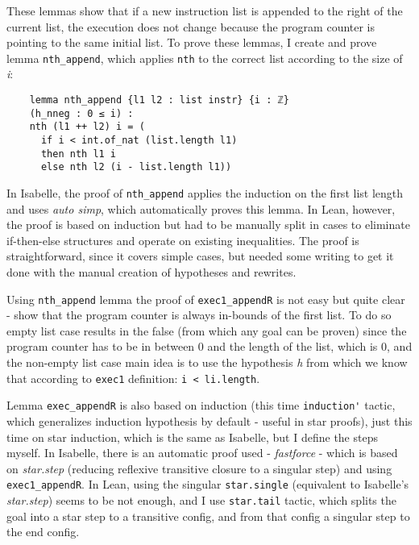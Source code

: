 These lemmas show that if a new instruction list is appended to the right of the current list, the execution does not change because the program counter is pointing to the same initial list. To prove these lemmas, I create and prove lemma \lstinline{nth_append}, which applies \lstinline{nth} to the correct list according to the size of \emph{i}:
\begin{lstlisting}
    lemma nth_append {l1 l2 : list instr} {i : ℤ}
    (h_nneg : 0 ≤ i) :
    nth (l1 ++ l2) i = (
      if i < int.of_nat (list.length l1)
      then nth l1 i
      else nth l2 (i - list.length l1))
\end{lstlisting}
In Isabelle, the proof of \lstinline{nth_append} applies the induction on the first list length and uses \emph{auto simp}, which automatically proves this lemma. In Lean, however, the proof is based on induction but had to be manually split in cases to eliminate if-then-else structures and operate on existing inequalities. The proof is straightforward, since it covers simple cases, but needed some writing to get it done with the manual creation of hypotheses and rewrites.

Using \lstinline{nth_append} lemma the proof of \lstinline{exec1_appendR} is not easy but quite clear - show that the program counter is always in-bounds of the first list. To do so empty list case results in the false (from which any goal can be proven) since the program counter has to be in between 0 and the length of the list, which is 0, and the non-empty list case main idea is to use the hypothesis \emph{h} from which we know that according to \lstinline{exec1} definition: \lstinline{i < li.length}.

Lemma \lstinline{exec_appendR} is also based on induction (this time \lstinline{induction'} tactic, which generalizes induction hypothesis by default - useful in star proofs), just this time on star induction, which is the same as Isabelle, but I define the steps myself. In Isabelle, there is an automatic proof used - \emph{fastforce} - which is based on \emph{star.step} (reducing reflexive transitive closure to a singular step) and using \lstinline{exec1_appendR}. In Lean, using the singular \lstinline{star.single} (equivalent to Isabelle's \emph{star.step}) seems to be not enough, and I use \lstinline{star.tail} tactic, which splits the goal into a star step to a transitive config, and from that config a singular step to the end config.

